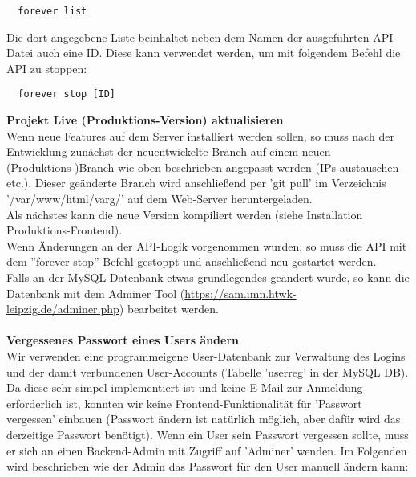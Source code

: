 \documentclass[twoside]{report}
\begin{document}
\begin{verbatim}
  forever list
\end{verbatim}
Die dort angegebene Liste beinhaltet neben dem Namen der ausgeführten API-Datei auch eine ID. Diese kann verwendet werden, um mit folgendem
Befehl die API zu stoppen:
\begin{verbatim}
  forever stop [ID]
\end{verbatim}
\textbf{Projekt Live (Produktions-Version) aktualisieren}
\\Wenn neue Features auf dem Server installiert werden sollen, so muss nach der Entwicklung zunächst der neuentwickelte Branch auf einem neuen (Produktions-)Branch
wie oben beschrieben angepasst werden (IPs austauschen etc.). Dieser geänderte Branch wird anschließend per 'git pull'
im Verzeichnis '/var/www/html/varg/' auf dem Web-Server heruntergeladen.
\\Als nächstes kann die neue Version kompiliert werden (siehe Installation Produktions-Frontend).
\\Wenn Änderungen an der API-Logik vorgenommen wurden, so muss die API mit dem ''forever stop'' Befehl gestoppt und anschließend neu gestartet werden.
\\Falls an der MySQL Datenbank etwas grundlegendes geändert wurde, so kann die Datenbank mit dem Adminer Tool (\url{https://sam.imn.htwk-leipzig.de/adminer.php})
bearbeitet werden.
\\\\\textbf{Vergessenes Passwort eines Users ändern}
\\Wir verwenden eine programmeigene User-Datenbank zur Verwaltung des Logins und der damit verbundenen User-Accounts (Tabelle 'userreg' in der MySQL DB). Da diese sehr simpel implementiert ist und keine E-Mail zur Anmeldung erforderlich ist, konnten wir keine Frontend-Funktionalität für 'Passwort vergessen' einbauen (Passwort ändern ist natürlich möglich, aber dafür wird das derzeitige Passwort benötigt). Wenn ein User sein Passwort vergessen sollte, muss er sich an einen Backend-Admin mit Zugriff auf 'Adminer' wenden. Im Folgenden wird beschrieben wie der Admin das Passwort für den User manuell ändern kann:
\end{document}
